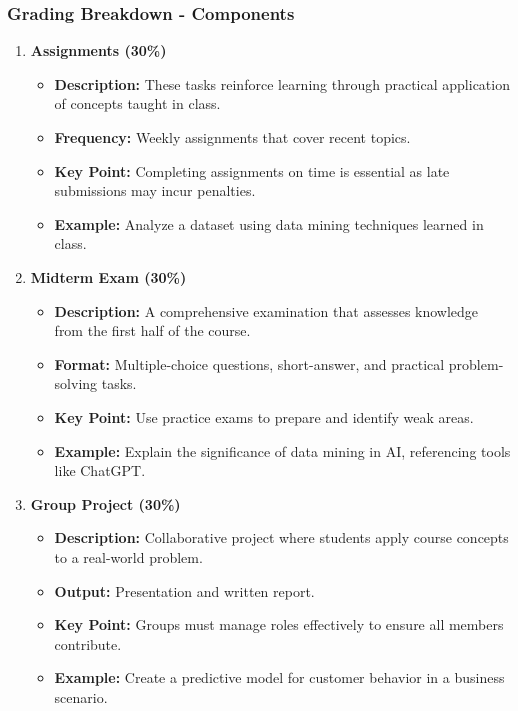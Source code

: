 \documentclass[aspectratio=169]{beamer}
\begin{document}
\begin{frame}[fragile]
    \frametitle{Grading Breakdown - Components}
    \begin{enumerate}
        \item \textbf{Assignments (30\%)}
            \begin{itemize}
                \item \textbf{Description:} These tasks reinforce learning through practical application of concepts taught in class.
                \item \textbf{Frequency:} Weekly assignments that cover recent topics.
                \item \textbf{Key Point:} Completing assignments on time is essential as late submissions may incur penalties.
                \item \textbf{Example:} Analyze a dataset using data mining techniques learned in class.
            \end{itemize}

        \item \textbf{Midterm Exam (30\%)}
            \begin{itemize}
                \item \textbf{Description:} A comprehensive examination that assesses knowledge from the first half of the course.
                \item \textbf{Format:} Multiple-choice questions, short-answer, and practical problem-solving tasks.
                \item \textbf{Key Point:} Use practice exams to prepare and identify weak areas.
                \item \textbf{Example:} Explain the significance of data mining in AI, referencing tools like ChatGPT.
            \end{itemize}

        \item \textbf{Group Project (30\%)}
            \begin{itemize}
                \item \textbf{Description:} Collaborative project where students apply course concepts to a real-world problem.
                \item \textbf{Output:} Presentation and written report.
                \item \textbf{Key Point:} Groups must manage roles effectively to ensure all members contribute.
                \item \textbf{Example:} Create a predictive model for customer behavior in a business scenario.
            \end{itemize}


\end{enumerate}
\end{frame}
\end{document}
